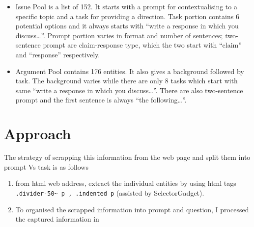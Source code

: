 \documentclass[]{article}
\providecommand{\tightlist}{%
  \setlength{\itemsep}{0pt}\setlength{\parskip}{0pt}}
\begin{document}
\begin{itemize}
\tightlist
\item
  Issue Pool is a list of 152. It starts with a prompt for
  contextualising to a specific topic and a task for providing a
  direction. Task portion contains 6 potential options and it always
  starts with ``write a response in which you discuss\ldots{}''. Prompt
  portion varies in format and number of sentences; two-sentence prompt
  are claim-response type, which the two start with ``claim'' and
  ``response'' respectively.
\item
  Argument Pool contains 176 entities. It also gives a background
  followed by task. The background varies while there are only 8 tasks
  which start with same ``write a response in which you
  discuss\ldots{}''. There are also two-sentence prompt and the first
  sentence is always ``the following\ldots{}''.
\end{itemize}

\hypertarget{approach}{%
\section{Approach}\label{approach}}

The strategy of scrapping this information from the web page and split
them into prompt Vs task is as follows

\begin{enumerate}
\def\labelenumi{\arabic{enumi}.}
\item
  from html web address, extract the individual entities by using html
  tags \texttt{.divider-50\textasciitilde{}\ p\ ,\ .indented\ p}
  (assisted by SelectorGadget).
\item
  To organised the scrapped information into prompt and question, I
  processed the captured information in
\end{enumerate}
\end{document}
